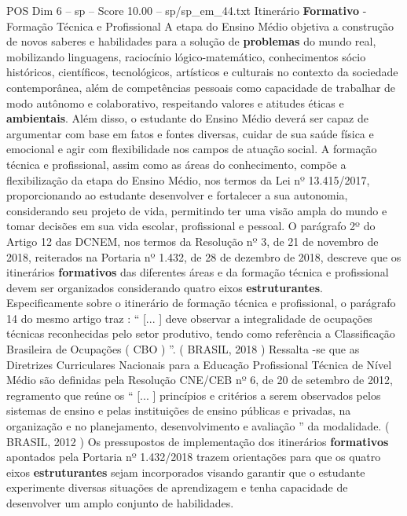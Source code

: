 \begin{textsample}{POS Dim 6 – sp – Score 10.00 – sp/sp\_em\_44.txt}  \label{ex:f6_pos_083}
Itinerário \textbf{Formativo} - Formação Técnica e Profissional A etapa do Ensino Médio objetiva a construção de novos saberes e habilidades para a solução de \textbf{problemas} do mundo real, mobilizando linguagens, raciocínio lógico-matemático, conhecimentos sócio históricos, científicos, tecnológicos, artísticos e culturais no contexto da sociedade contemporânea, além de competências pessoais como capacidade de trabalhar de modo autônomo e colaborativo, respeitando valores e atitudes éticas e \textbf{ambientais}.
Além disso, o estudante do Ensino Médio deverá ser capaz de argumentar com base em fatos e fontes diversas, cuidar de sua saúde física e emocional e agir com flexibilidade nos campos de atuação social.
A formação técnica e profissional, assim como as áreas do conhecimento, compõe a flexibilização da etapa do Ensino Médio, nos termos da Lei nº 13.415/2017, proporcionando ao estudante desenvolver e fortalecer a sua autonomia, considerando seu projeto de vida, permitindo ter uma visão ampla do mundo e tomar decisões em sua vida escolar, profissional e pessoal.
O parágrafo 2º do Artigo 12 das DCNEM, nos termos da Resolução nº 3, de 21 de novembro de 2018, reiterados na Portaria nº 1.432, de 28 de dezembro de 2018, descreve que os itinerários \textbf{formativos} das diferentes áreas e da formação técnica e profissional devem ser organizados considerando quatro eixos \textbf{estruturantes}.
Especificamente sobre o itinerário de formação técnica e profissional, o parágrafo 14 do mesmo artigo traz : “ [... ] deve observar a integralidade de ocupações técnicas reconhecidas pelo setor produtivo, tendo como referência a Classificação Brasileira de Ocupações ( CBO ) ”. ( BRASIL, 2018 ) Ressalta -se que as Diretrizes Curriculares Nacionais para a Educação Profissional Técnica de Nível Médio são definidas pela Resolução CNE/CEB nº 6, de 20 de setembro de 2012, regramento que reúne os “ [... ] princípios e critérios a serem observados pelos sistemas de ensino e pelas instituições de ensino públicas e privadas, na organização e no planejamento, desenvolvimento e avaliação ” da modalidade. ( BRASIL, 2012 ) Os pressupostos de implementação dos itinerários \textbf{formativos} apontados pela Portaria nº 1.432/2018 trazem orientações para que os quatro eixos \textbf{estruturantes} sejam incorporados visando garantir que o estudante experimente diversas situações de aprendizagem e tenha capacidade de desenvolver um amplo conjunto de habilidades.

\end{textsample}
